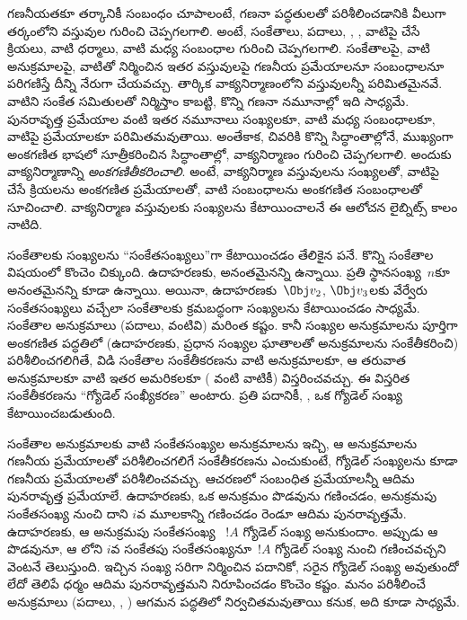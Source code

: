 \documentclass[../../../include/open-logic-section]{subfiles}
\begin{document}

గణనీయతకూ తర్కానికీ సంబంధం చూపాలంటే, గణనా పద్ధతులతో పరిశీలించడానికి వీలుగా తర్కంలోని వస్తువుల గురించి చెప్పగలగాలి.
అంటే, సంకేతాలు, పదాలు, ,
, వాటిపై చేసే క్రియలు, వాటి ధర్మాలు,
వాటి మధ్య సంబంధాల గురించి చెప్పగలగాలి. సంకేతాలపై, వాటి అనుక్రమాలపై, వాటితో
నిర్మించిన ఇతర వస్తువులపై గణనీయ ప్రమేయాలనూ సంబంధాలనూ పరిగణిస్తే దీన్ని
నేరుగా చేయవచ్చు. తార్కిక వాక్యనిర్మాణంలోని వస్తువులన్నీ పరిమితమైనవే.
వాటిని  సంకేత సమితులతో నిర్మిస్తాం కాబట్టి,
కొన్ని గణనా నమూనాల్లో ఇది సాధ్యమే. పునరావృత్త ప్రమేయాల వంటి ఇతర నమూనాలు
సంఖ్యలకూ, వాటి మధ్య సంబంధాలకూ, వాటిపై ప్రమేయాలకూ పరిమితమవుతాయి. అంతేకాక,
చివరికి కొన్ని సిద్ధాంతాల్లోనే, ముఖ్యంగా అంకగణిత భాషలో సూత్రీకరించిన సిద్ధాంతాల్లో,
వాక్యనిర్మాణం గురించి చెప్పగలగాలి. అందుకు వాక్యనిర్మాణాన్ని
\emph{అంకగణితీకరించాలి}. అంటే, వాక్యనిర్మాణ వస్తువులను సంఖ్యలతో, వాటిపై చేసే
క్రియలను అంకగణిత ప్రమేయాలతో, వాటి సంబంధాలను అంకగణిత సంబంధాలతో సూచించాలి.
వాక్యనిర్మాణ వస్తువులకు సంఖ్యలను కేటాయించాలనే ఈ ఆలోచన లైబ్నిట్స్ కాలం నాటిది.

సంకేతాలకు సంఖ్యలను ``సంకేతసంఖ్యలు''గా కేటాయించడం తేలికైన పనే. కొన్ని
సంకేతాల విషయంలో కొంచెం చిక్కుంది. ఉదాహరణకు, అనంతమైనన్ని
 ఉన్నాయి. ప్రతి స్థానసంఖ్య~$n$కూ అనంతమైనన్ని
 కూడా ఉన్నాయి. అయినా,
ఉదాహరణకు~$\Obj v_2$, $\Obj v_3$లకు వేర్వేరు సంకేతసంఖ్యలు వచ్చేలా సంకేతాలకు
క్రమబద్ధంగా సంఖ్యలను కేటాయించడం సాధ్యమే. సంకేతాల అనుక్రమాలు (పదాలు,
 వంటివి) మరింత కష్టం. కానీ సంఖ్యల అనుక్రమాలను
పూర్తిగా అంకగణిత పద్ధతిలో (ఉదాహరణకు, ప్రధాన సంఖ్యల ఘాతాలతో అనుక్రమాలను సంకేతీకరించి)
పరిశీలించగలిగితే, విడి సంకేతాల సంకేతీకరణను వాటి అనుక్రమాలకూ, ఆ తరువాత
 అనుక్రమాలకూ వాటి ఇతర అమరికలకూ
( వంటి వాటికీ) విస్తరించవచ్చు. ఈ
విస్తరిత సంకేతీకరణను ``గ్యోడెల్ సంఖ్యీకరణ'' అంటారు. ప్రతి పదానికీ,
, 
ఒక గ్యోడెల్ సంఖ్య కేటాయించబడుతుంది.

సంకేతాల అనుక్రమాలకు వాటి సంకేతసంఖ్యల అనుక్రమాలను ఇచ్చి, ఆ అనుక్రమాలను గణనీయ
ప్రమేయాలతో పరిశీలించగలిగే సంకేతీకరణను ఎంచుకుంటే, గ్యోడెల్
సంఖ్యలను కూడా గణనీయ ప్రమేయాలతో పరిశీలించవచ్చు. ఆచరణలో సంబంధిత ప్రమేయాలన్నీ
ఆదిమ పునరావృత్త ప్రమేయాలే. ఉదాహరణకు, ఒక అనుక్రమం పొడవును గణించడం,
అనుక్రమపు సంకేతసంఖ్య నుంచి దాని $i$వ మూలకాన్ని గణించడం రెండూ ఆదిమ పునరావృత్తమే.
ఉదాహరణకు, ఆ అనుక్రమపు సంకేతసంఖ్య ~$!A$ గ్యోడెల్
సంఖ్య అనుకుందాం. అప్పుడు ఆ  పొడవునూ,
ఆ లోని $i$వ సంకేతపు సంకేతసంఖ్యనూ~$!A$ గ్యోడెల్
సంఖ్య నుంచి గణించవచ్చని వెంటనే తెలుస్తుంది. ఇచ్చిన సంఖ్య సరిగా నిర్మించిన
పదానికో, సరైన  గ్యోడెల్ సంఖ్య అవుతుందో
లేదో తెలిపే ధర్మం ఆదిమ పునరావృత్తమని నిరూపించడం కొంచెం కష్టం. మనం పరిశీలించే అనుక్రమాలు (పదాలు,
, )
ఆగమన పద్ధతిలో నిర్వచితమవుతాయి కనుక, అది కూడా సాధ్యమే.
\end{document}

